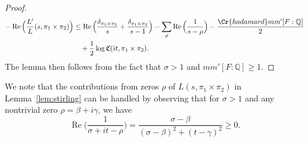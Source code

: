 \documentclass[12pt,reqno]{amsart}
\newtheorem{prop}[thm]{Proposition}
\theoremstyle{remark}
\DeclareMathOperator{\Real}{Re}
\numberwithin{equation}{section}
\begin{document}
\begin{proof}
   \begin{equation}
   \begin{aligned}
            -\Real\Big(\frac{L'}{L}(s, \pi_1 \times \pi_2)\Big) &\le  \Real\Big(\frac{\delta_{\pi_1\times \pi_2}}{s}+\frac{\delta_{\pi_1\times \pi_2}}{s-1}\Big) - \sum_{\rho} \Real\Big( \frac{1}{s-\rho}\Big)
            -\frac{\Cr{hadamard}mm'[F:\mathbb{Q}]}{2}\\ &\quad
            +  \frac{1}{2}\log\mathfrak{C}(it, \pi_1 \times \pi_2).
        \end{aligned}
        \end{equation}
    The lemma then follows from the fact that $\sigma > 1$ and $mm'[F:\mathbb{Q}] \ge 1$.
    \end{proof}
    
    We note that the contributions from zeros $\rho$ of $L(s, \pi_1 \times \pi_2)$ in Lemma~\ref{lem:stirling} can be handled by observing that for $\sigma > 1$ and any nontrivial zero $\rho = \beta+i\gamma$, we have 
	\begin{equation}
		\label{eq:positivity}
		\Real\Big(\frac{1}{\sigma+it -\rho}\Big) = \frac{\sigma -\beta}{(\sigma-\beta)^2+(t - \gamma)^2} \ge 0. 
	\end{equation}
\end{document}
